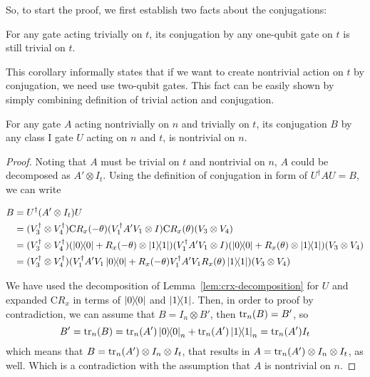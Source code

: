 So, to start the proof, we first establish two facts about the conjugations:
\begin{corollary}\label{cor:no-go-one-qubit}
  For any gate acting trivially on $t$, its conjugation by any one-qubit gate on $t$ is still trivial on $t$. 
\end{corollary}

This corollary informally states that if we want to create nontrivial action on $t$ by conjugation, we need use two-qubit gates. This fact can be easily shown by simply combining definition of trivial action and conjugation.

\begin{lemma}\label{lem:no-move-class-i}
  For any gate $A$ acting nontrivially on $n$ and trivially on $t$, its conjugation $B$ by any class I gate $U$ acting on $n$ and $t$, is nontrivial on $n$.
\end{lemma}
\begin{proof}
  Noting that $A$ must be trivial on $t$ and nontrivial on $n$, $A$ could be decomposed as $A' \otimes I_t$.
  Using the definition of conjugation in form of $U^\dagger A U = B$, we can write

  \begin{equation}
    \begin{aligned}
    B &= U^\dagger (A' \otimes I_t) U  \\
    &= (V_3^\dagger \otimes V_4^\dagger)\mathrm{C}R_x(-\theta) (V_1^\dagger A' V_1 \otimes I) \mathrm{C}R_x(\theta) (V_3 \otimes V_4) \\
    &= (V_3^\dagger \otimes V_4^\dagger)(\dyad{0} + R_x(-\theta) \otimes \dyad{1}) (V_1^\dagger A' V_1 \otimes I) (\dyad{0} + R_x(\theta) \otimes \dyad{1}) (V_3 \otimes V_4) \\
    &= (V_3^\dagger \otimes V_4^\dagger)(V_1^\dagger A' V_1 \dyad{0} + R_x(-\theta) V_1^\dagger A' V_1 R_x(\theta) \dyad{1}) (V_3 \otimes V_4)
    \end{aligned}
  \end{equation}

  We have used the decomposition of Lemma~\ref{lem:crx-decomposition} for $U$ and expanded $\mathrm{C}R_x$ in terms of $\dyad{0}$ and $\dyad{1}$. Then, in order to proof by contradiction, we can assume that $B = I_n \otimes B'$, then $\tr_n(B) = B'$, so
  \begin{equation}
    B' = \tr_n(B) = \tr_n(A') \dyad{0}_n + \tr_n(A') \dyad{1}_n = \tr_n(A') I_t
  \end{equation}
  which means that $B = \tr_n(A') \otimes I_n \otimes I_t$, that results in $A = \tr_n(A') \otimes I_n \otimes I_t$,  as well. Which is a contradiction with the assumption that $A$ is nontrivial on $n$.
\end{proof}


